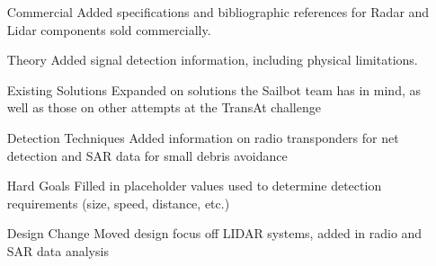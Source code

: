 \begin{itemize}
\item[Commercial] Added specifications and bibliographic references for Radar and Lidar components sold commercially.
\item[Theory] Added signal detection information, including physical limitations.
\item[Existing Solutions] Expanded on solutions the Sailbot team has in mind, as well as those on other attempts at the TransAt challenge
\item[Detection Techniques] Added information on radio transponders for net detection and SAR data for small debris avoidance
\item[Hard Goals] Filled in placeholder values used to determine detection requirements (size, speed, distance, etc.)
\item[Design Change] Moved design focus off LIDAR systems, added in radio and SAR data analysis
\end{itemize}